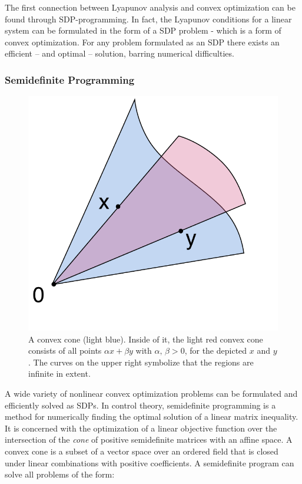 The first connection between Lyapunov analysis and convex optimization can be
found through \ac{SDP}-programming. In fact, the Lyapunov conditions for a
linear system can be formulated in the form of a \ac{SDP} problem - which is a
form of convex optimization. For any problem formulated as an \ac{SDP} there
exists an efficient -- and optimal -- solution, barring numerical difficulties.

\subsubsection{Semidefinite Programming}

\begin{figure}
  \centering
  \includegraphics[scale=.5]{figures/preliminaries/Convex_cone_illust}
  \caption[A convex cone illustrated]{A convex cone (light blue). Inside of it, the light red convex cone
    consists of all points \(\alpha x + \beta y \) with \(\alpha,\, \beta > 0\),
    for the depicted \(x\) and \(y\). The curves on the upper right symbolize
    that the regions are infinite in extent.
    \cite{alexandrovConvexConeIllust2019}}
\end{figure}


A wide variety of nonlinear convex optimization problems can be formulated and
efficiently solved as \ac{SDP}s. In control theory, semidefinite programming is
a method for numerically finding the optimal solution of a linear matrix
inequality. It is concerned with the optimization of a linear objective function
over the intersection of the \textit{cone} of positive semidefinite matrices
with an affine space. A convex cone is a subset of a vector space over an
ordered field that is closed under linear combinations with positive
coefficients. A semidefinite program can solve all problems of the form:

